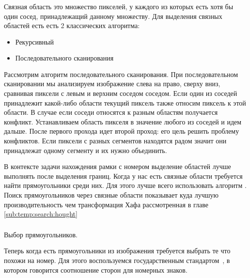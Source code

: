 \subsubsection{}
\label{sub:temp:search:segmentation}
\segmentation{}

Связная область это множество пикселей, у каждого из которых есть хотя бы один сосед, принадлежащий данному множеству. Для выделения связных областей есть есть 2 классических алгоритма:
\begin{itemize}
  \item Рекурсивный
  \item Последовательного сканирования
\end{itemize}
Рассмотрим алгоритм последовательного сканирования. При последовательном сканировании мы анализируем изображение слева на право, сверху вниз, сравнивая пиксели с левым и верхним соседом соседом. Если один из соседей принадлежит какой-либо области текущий пиксель также относим пиксель к этой области. В случае если соседи относятся к разным областям получается конфликт. Устанавливаем область пикселя в значение любого из соседей и идем дальше. После первого прохода идет второй проход: его цель решить проблему конфликтов. Если пиксели с разных сегментов находятся радом значит они принадлежат одному сегменту и их нужно объединить. 

В контексте задачи нахождения рамки с номером выделение областей лучше выполнять после выделения границ. Когда у нас есть связные области требуется найти прямоугольники среди них. Для этого лучше всего использовать алгоритм \minAreaRect{}. Поиск прямоугольников через связные области показывает куда лучшую производительность чем трансформация Хафа рассмотренная в главе \ref{sub:temp:search:hought}

\subsubsection{}
\label{sub:temp:search:selectrect}
Выбор прямоугольников.

Теперь когда есть прямоугольники из изображения требуется выбрать те что похожи на номер. Для этого воспользуемся государственным стандартом~\cite{stb_914_99}, в котором говорится соотношение сторон для номерных знаков.